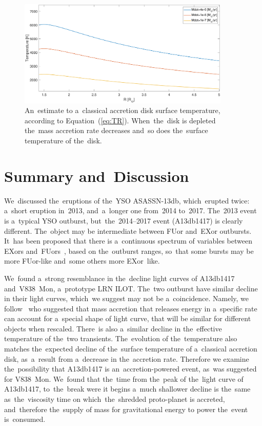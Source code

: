 \documentclass[galaxies,article,accept,moreauthors,pdftex]{mdpi}
\begin{document}
%
\begin{figure}[t]
\centering
\includegraphics[trim= 0.0cm 0.0cm 0.0cm 0.0cm,clip=true,width=0.9\textwidth]{figure6.pdf}
\caption{An~estimate to a~classical accretion disk surface temperature, according to Equation~(\ref{eq:TR}). When~the~disk is depleted the~mass accretion rate decreases and~so does the~surface temperature of the~disk.}
\label{fig:TR}
\end{figure}

\section{Summary and~Discussion} 
\label{sec:summary}

We~discussed the~eruptions of the~YSO ASASSN-13db, which~erupted twice: a~short eruption in~2013, and~a~longer one from~2014 to~2017. The~2013 event is a~typical YSO outburst, but~the~2014--2017 event (A13db1417) is clearly different. The~object may be intermediate between FUor and~EXor outbursts. It~has been proposed that there is a~continuous spectrum of variables between EXors and~FUors~\citep{ContrerasPenaetal2017}, based on the~outburst ranges, so~that some bursts may be more FUor-like and~some others more EXor~like.

We~found a~strong resemblance in the~decline light curves of A13db1417 and~V838~Mon, a~prototype LRN ILOT. The~two outburst have similar decline in their light curves, which~we suggest may not be a~coincidence. Namely, we follow~\cite{Kashietal2010} who suggested that mass accretion that releases energy in a~specific rate can account for a~special shape of light curve, that will be similar for different objects when rescaled. There~is also a~similar decline in the~effective temperature of the~two transients. The~evolution of the~temperature also matches the~expected decline of the~surface temperature of a~classical accretion disk, as~a~result from a~decrease in the~accretion rate. Therefore we examine the~possibility that A13db1417 is an~accretion-powered event, as~was suggested for V838~Mon. We~found that the~time from the~peak of the~light curve of A13db1417, to~the~break were it begins a~much shallower decline is the~same as~the~viscosity time on which~the~shredded proto-planet is accreted, and~therefore the~supply of mass for gravitational energy to power the~event is~consumed.
\end{document}
